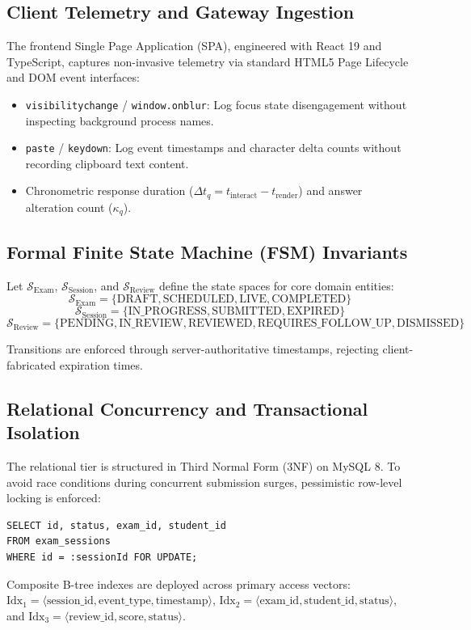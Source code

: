 \documentclass[journal]{IEEEtran}
\begin{document}
\subsection{Client Telemetry and Gateway Ingestion}
The frontend Single Page Application (SPA), engineered with React 19 and TypeScript, captures non-invasive telemetry via standard HTML5 Page Lifecycle and DOM event interfaces:
\begin{itemize}
    \item \texttt{visibilitychange} / \texttt{window.onblur}: Log focus state disengagement without inspecting background process names.
    \item \texttt{paste} / \texttt{keydown}: Log event timestamps and character delta counts without recording clipboard text content.
    \item Chronometric response duration ($\Delta t_q = t_{\text{interact}} - t_{\text{render}}$) and answer alteration count ($\kappa_q$).
\end{itemize}

\subsection{Formal Finite State Machine (FSM) Invariants}
Let $\mathcal{S}_{\text{Exam}}$, $\mathcal{S}_{\text{Session}}$, and $\mathcal{S}_{\text{Review}}$ define the state spaces for core domain entities:
\begin{equation}
\mathcal{S}_{\text{Exam}} = \{\text{DRAFT}, \text{SCHEDULED}, \text{LIVE}, \text{COMPLETED}\}
\end{equation}
\begin{equation}
\mathcal{S}_{\text{Session}} = \{\text{IN\_PROGRESS}, \text{SUBMITTED}, \text{EXPIRED}\}
\end{equation}
\begin{equation}
\mathcal{S}_{\text{Review}} = \{\text{PENDING}, \text{IN\_REVIEW}, \text{REVIEWED}, \text{REQUIRES\_FOLLOW\_UP}, \text{DISMISSED}\}
\end{equation}

Transitions are enforced through server-authoritative timestamps, rejecting client-fabricated expiration times.

\subsection{Relational Concurrency and Transactional Isolation}
The relational tier is structured in Third Normal Form (3NF) on MySQL 8. To avoid race conditions during concurrent submission surges, pessimistic row-level locking is enforced:
\begin{verbatim}
SELECT id, status, exam_id, student_id 
FROM exam_sessions 
WHERE id = :sessionId FOR UPDATE;
\end{verbatim}
Composite B-tree indexes are deployed across primary access vectors:
$\text{Idx}_1 = \langle \text{session\_id}, \text{event\_type}, \text{timestamp} \rangle$, $\text{Idx}_2 = \langle \text{exam\_id}, \text{student\_id}, \text{status} \rangle$, and $\text{Idx}_3 = \langle \text{review\_id}, \text{score}, \text{status} \rangle$.
\end{document}
